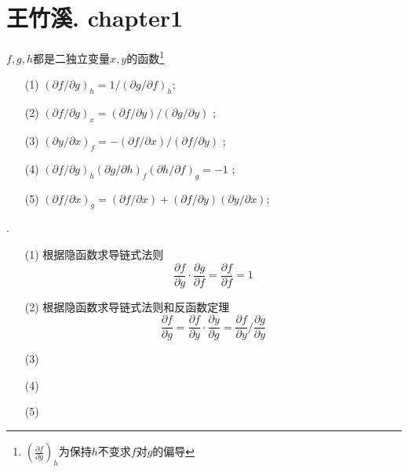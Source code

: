 \chapter{王竹溪. chapter1}

\begin{question}[p24,2] $f,g,h$都是二独立变量$x,y$的函数\footnote{$(\frac{\partial f}{\partial g})_h$为保持$h$不变求$f$对$g$的偏导}

\begin{enumerate}[itemindent=2em]
    \item[(1)] $(\partial f/\partial g)_h=1/(\partial g/\partial f)_h$;
    \item[(2)] $(\partial f/\partial g)_x=(\partial f/\partial y)/(\partial g/\partial y)$ ;
    \item[(3)] $(\partial y/\partial x)_f=-(\partial f/\partial x)/(\partial f/\partial y)$ ;
    \item[(4)] $(\partial f/\partial g)_h(\partial g/\partial h)_f(\partial h/\partial f)_g=-1$ ;
    \item[(5)] $(\partial f/\partial x)_g=(\partial f/\partial x)+(\partial f/\partial y)(\partial y/\partial x)$; 
\end{enumerate}

\end{question}

\begin{mdframed}[linewidth=0pt, backgroundcolor=gray!15]
    \begin{pf}.
        \begin{enumerate}[itemindent=2em]
            \item[(1)] 根据隐函数求导链式法则
            \begin{equation}
                \frac{\partial f}{\partial g}\cdot \frac{\partial g}{\partial f} = \frac{\partial f}{\partial f}=1
            \end{equation}
            \item[(2)] 根据隐函数求导链式法则和反函数定理
            \begin{equation}
                \frac{\partial f}{\partial g}=\frac{\partial f}{\partial y}\cdot \frac{\partial y}{\partial g}=\frac{\partial f}{\partial y}/\frac{\partial g}{\partial y}
            \end{equation}
            \item[(3)]
            \item[(4)]
            \item[(5)]   
        \end{enumerate}
    \end{pf}
\end{mdframed}


